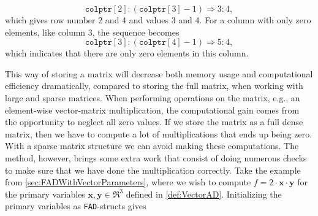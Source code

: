 \begin{equation*}
    \texttt{colptr}[2]:(\texttt{colptr}[3]-1) \Longrightarrow 3:4,
\end{equation*}
which gives row number 2 and 4 and values 3 and 4. For a column with only zero elements, like column 3, the sequence becomes
\begin{equation*}
    \texttt{colptr}[3]:(\texttt{colptr}[4]-1)\Longrightarrow 5:4,
\end{equation*}
which indicates that there are only zero elements in this column. 

This way of storing a matrix will decrease both memory usage and computational efficiency dramatically, compared to storing the full matrix, when working with large and sparse matrices. When performing operations on the matrix, e.g., an element-wise vector-matrix  multiplication, the computational gain comes from the opportunity to neglect all zero values. If we store the matrix as a full dense matrix, then we have to compute a lot of multiplications that ends up being zero. With a sparse matrix structure we can avoid making these computations. The method, however, brings some extra work that consist of doing numerous checks to make sure that we have done the multiplication correctly. Take the example from \autoref{sec:FADWithVectorParameters}, where we wish to compute $f = 2\cdot \textbf{x}\cdot \textbf{y}$ for the primary variables $\textbf{x},\textbf{y}\in \Re^3$ defined in \eqref{def:VectorAD}. Initializing the primary variables as \texttt{FAD}-structs gives 
